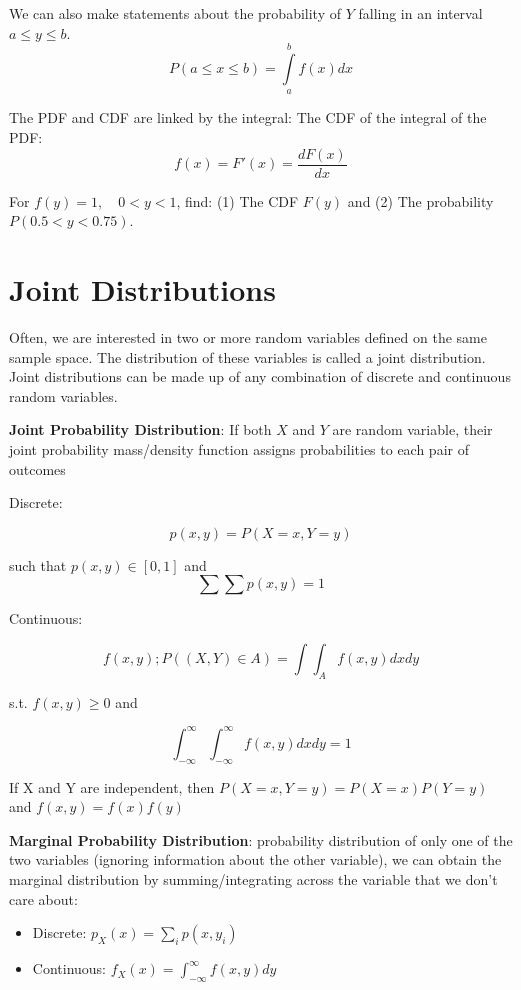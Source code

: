 \documentclass[
]{book}
\begin{document}
We can also make statements about the probability of \(Y\) falling in an interval \(a\le y\le b\).
\[P(a\le x\le b)=\int\limits_a^b f(x)dx\]

The PDF and CDF are linked by the integral: The CDF of the integral of the PDF: \[f(x) = F'(x)=\frac{dF(x)}{dx}\]

\begin{example}
\protect\hypertarget{exm:unnamed-chunk-81}{}\label{exm:unnamed-chunk-81}For \(f(y)=1, \quad 0<y<1\), find: (1) The CDF \(F(y)\) and (2) The probability \(P(0.5<y<0.75)\).
\end{example}

\hypertarget{joint-distributions}{%
\section{Joint Distributions}\label{joint-distributions}}

Often, we are interested in two or more random variables defined on the same sample space. The distribution of these variables is called a joint distribution. Joint distributions can be made up of any combination of discrete and continuous random variables.

\textbf{Joint Probability Distribution}: If both \(X\) and \(Y\) are random variable, their joint probability mass/density function assigns probabilities to each pair of outcomes

Discrete:

\[p(x, y) = P(X = x, Y = y)\]

such that \(p(x,y) \in [0,1]\) and \[\sum\sum p(x,y) = 1\]

Continuous:

\[f(x,y);P((X,Y) \in A) = \int\!\!\!\int_A f(x,y)dx dy \]

s.t. \(f(x,y)\ge 0\) and

\[\int_{-\infty}^\infty\int_{-\infty}^\infty f(x,y)dxdy = 1\]

If X and Y are independent, then \(P(X=x,Y=y) = P(X=x)P(Y=y)\) and \(f(x,y) = f(x)f(y)\)

\textbf{Marginal Probability Distribution}: probability distribution of only one of the two variables (ignoring information about the other variable), we can obtain the marginal distribution by summing/integrating across the variable that we don't care about:

\begin{itemize}
\tightlist
\item
  Discrete: \(p_X(x) = \sum_i p(x, y_i)\)
\item
  Continuous: \(f_X(x) = \int_{-\infty}^\infty f(x,y)dy\)
\end{itemize}
\end{document}

